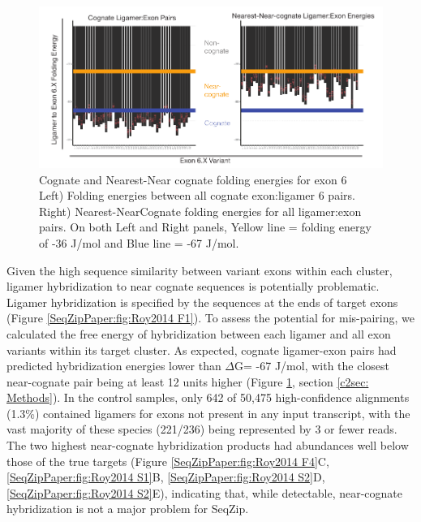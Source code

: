 		\begin{figure} %
			\centering 
			\includegraphics{Figures/SeqZipPaper/Roy2014FigS3.eps}
			\caption[Cognate and Nearest-Near cognate folding energies for \dscam{} exon 6]
			{
				Cognate and Nearest-Near cognate folding energies for \dscam{} exon 6\\[0.25cm]
				Left) Folding energies between all cognate exon:ligamer 6 pairs. Right) Nearest-NearCognate folding energies for all ligamer:exon pairs. On both Left and Right panels, Yellow line = folding energy of -36 J/mol and Blue line = -67 J/mol.
				}
			\label{SeqZipPaper:fig:Roy2014 FS3}
			\end{figure}

		Given the high sequence similarity between variant exons within each cluster, ligamer hybridization to near cognate sequences is potentially problematic. Ligamer hybridization is specified by the sequences at the ends of target exons (Figure \ref{SeqZipPaper:fig:Roy2014 F1}). To assess the potential for mis-pairing, we calculated the free energy of hybridization \citep{Reuter2010} between each ligamer and all exon variants within its target cluster. As expected, cognate ligamer-exon pairs had predicted hybridization energies lower than $\Delta$G\degree = -67 J/mol, with the closest near-cognate pair being at least 12 units higher (Figure \ref{SeqZipPaper:fig:Roy2014 FS3}, section \ref{c2sec: Methods}). In the control samples, only 642 of 50,475 high-confidence alignments (1.3\%) contained ligamers for exons not present in any input transcript, with the vast majority of these species (221/236) being represented by 3 or fewer reads.  The two highest near-cognate hybridization products had abundances well below those of the true targets (Figure \ref{SeqZipPaper:fig:Roy2014 F4}C, \ref{SeqZipPaper:fig:Roy2014 S1}B, \ref{SeqZipPaper:fig:Roy2014 S2}D, \ref{SeqZipPaper:fig:Roy2014 S2}E), indicating that, while detectable, near-cognate hybridization is not a major problem for SeqZip.


